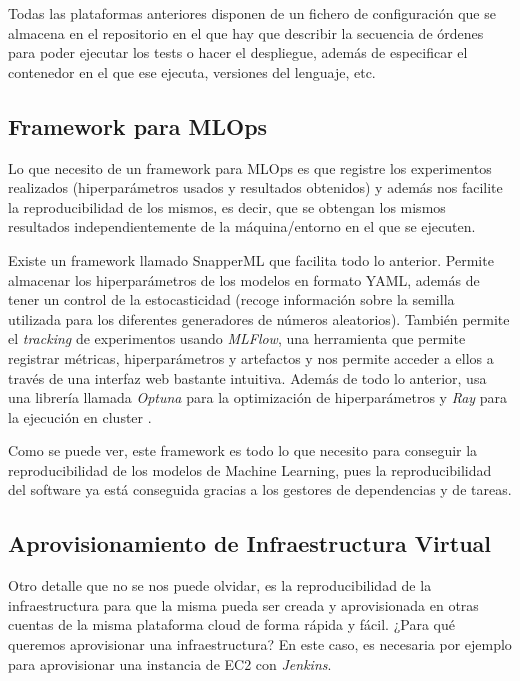Todas las plataformas anteriores disponen de un fichero de configuración que se almacena en el repositorio en el que hay que describir la secuencia de órdenes para poder ejecutar los tests o hacer el despliegue, además de especificar el contenedor en el que ese ejecuta, versiones del lenguaje, etc.

\subsection{Framework para MLOps}

Lo que necesito de un framework para MLOps es que registre los experimentos realizados (hiperparámetros usados y resultados obtenidos) y además nos facilite la reproducibilidad de los mismos, es decir, que se obtengan los mismos resultados independientemente de la máquina/entorno en el que se ejecuten.\newline

Existe un framework llamado SnapperML que facilita todo lo anterior. Permite almacenar los hiperparámetros de los modelos en formato YAML, además de tener un control de la estocasticidad (recoge información sobre la semilla utilizada para los diferentes generadores de números aleatorios). También permite el \textit{tracking} de experimentos usando \textit{MLFlow}, una herramienta que permite registrar métricas, hiperparámetros y artefactos y nos permite acceder a ellos a través de una interfaz web bastante intuitiva. Además de todo lo anterior, usa una librería llamada \textit{Optuna} para la optimización de hiperparámetros y \textit{Ray} para la ejecución en cluster \cite{snapperml}.\newline

Como se puede ver, este framework es todo lo que necesito para conseguir la reproducibilidad de los modelos de Machine Learning, pues la reproducibilidad del software ya está conseguida gracias a los gestores de dependencias y de tareas.

\subsection{Aprovisionamiento de Infraestructura Virtual}

Otro detalle que no se nos puede olvidar, es la reproducibilidad de la infraestructura para que la misma pueda ser creada y aprovisionada en otras cuentas de la misma plataforma cloud de forma rápida y fácil. ¿Para qué queremos aprovisionar una infraestructura? En este caso, es necesaria por ejemplo para aprovisionar una instancia de EC2 con \textit{Jenkins}.\newline

